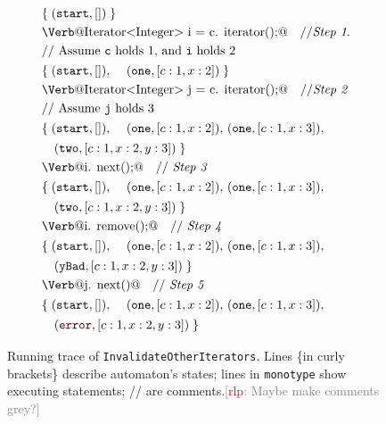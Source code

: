 \documentclass[10pt, preprint]{sigplanconf} %
\newcommand{\noterg}[2]{\textcolor{gray}{[\textcolor{red}{#1}: #2]}}
\newcommand{\rlp}[1]{\noterg{rlp}{#1}}
\newcommand{\error}{\ensuremath{\textcolor{darkred}{\mathtt{error}}}\xspace}
\newcommand{\start}{\ensuremath{\mathtt{start}}\xspace}
\begin{document}
%
\begin{figure}[t]
{\def\s#1{\text{\Verb@#1@}}
 \def\m#1{\PY{n+na}{#1}}
 \def\t#1{\mathtt{#1}}
\begin{align*}
&\{\;(\start,[])\;\} \\
&\s{Iterator<Integer> i = c.\m{iterator}();}  \quad \text{//{\bf \it Step 1}.} \\
&\text{// Assume {\tt c} holds $1$, and {\tt i} holds $2$ } \\
& \begin{aligned}
  \{\;&(\start,[]),\
      &(\t{one},[c:1,x:2])\;\}
  \end{aligned}\\
&\s{Iterator<Integer> j = c.\m{iterator}();}  \quad \text{//{\bf \it Step 2}} \\
&\text{// Assume {\tt j} holds $3$} \\
& \begin{aligned}
  \{\;&(\start,[]),\
      &(\t{one},[c:1,x:2]),\
      &(\t{one},[c:1,x:3]),\
   \end{aligned}\\
& \begin{aligned}   
      & \quad (\t{two},[c:1,x:2,y:3])\;\}
  \end{aligned}\\
&\s{i.\m{next}();} \quad \text{// {\bf \it Step 3}} \\
& \begin{aligned}
  \{\;&(\start,[]),\
      &(\t{one},[c:1,x:2]),\
      &(\t{one},[c:1,x:3]),\
   \end{aligned}\\
& \begin{aligned}   
      & \quad (\t{two},[c:1,x:2,y:3])\;\}
  \end{aligned}\\
&\s{i.\m{remove}();} \quad \text{// {\bf \it Step 4}}  \\
& \begin{aligned}
  \{\;&(\start,[]),\
      &(\t{one},[c:1,x:2]),\
      &(\t{one},[c:1,x:3]),\
   \end{aligned}\\
& \begin{aligned}   
      & \quad (\t{yBad},[c:1,x:2,y:3])\;\}
  \end{aligned}\\
&\s{j.\m{next}()} \quad \text{// {\bf \it Step 5}}  \\
& \begin{aligned}
  \{\;&(\start,[]),\
      &(\t{one},[c:1,x:2]),\
      &(\t{one},[c:1,x:3]),\
   \end{aligned}\\
& \begin{aligned}   
      & \quad (\error,[c:1,x:2,y:3])\;\}
  \end{aligned}\\
\end{align*}}
\caption{Running trace of {\tt InvalidateOtherIterators}. Lines \{in curly brackets\} describe automaton's states;
lines in \texttt{monotype} show executing statements;
// are comments.\rlp{Maybe make comments grey?}}
\label{fig:first.steps}
\end{figure} %
\end{document}
